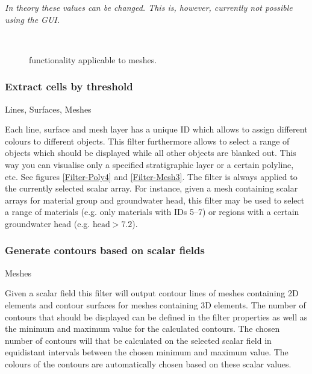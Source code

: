  \emph{In theory these values can be changed. This is, however, currently not possible using the GUI.}

\begin{figure}[tb]
\begin{center}
\enspace
{} \\
\enspace
{}
\end{center}
\caption{\ogs functionality applicable to meshes.} \label{fig:filter:mesh}
\end{figure}

\subsubsection{Extract cells by threshold}
 Lines, Surfaces, Meshes

 Each line, surface and mesh layer has a unique ID which allows to assign different colours to different objects. This filter furthermore allows to select a range of objects which should be displayed while all other objects are blanked out. This way you can visualise only a specified stratigraphic layer or a certain polyline, etc. See figures \ref{Filter-Poly4} and \ref{Filter-Mesh3}. The filter is always applied to the currently selected scalar array. For instance, given a mesh containing scalar arrays for material group and groundwater head, this filter may be used to select a range of materials (e.g. only materials with IDs 5--7) or regions with a certain groundwater head (e.g. $\text{head}>7.2$).

\subsubsection{Generate contours based on scalar fields}
 Meshes

 Given a scalar field this filter will output contour lines of meshes containing 2D elements and contour surfaces for meshes containing 3D elements. The number of contours that should be displayed can be defined in the filter properties as well as the minimum and maximum value for the calculated contours. The chosen number of contours will that be calculated on the selected scalar field in equidistant intervals between the chosen minimum and maximum value. The colours of the contours are automatically chosen based on these scalar values.


